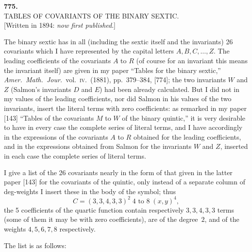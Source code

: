 \documentclass[11pt]{article}
\begin{document}

\begin{center}
\textbf{775.}\\[4pt]
\textsc{TABLES OF COVARIANTS OF THE BINARY SEXTIC.}\\[4pt]
[Written in 1894: \textit{now first published}.]
\end{center}

\bigskip

\noindent
The binary sextic has in all (including the sextic itself and the
invariants) 26 covariants which I have represented by the capital
letters $A,B,C,\ldots,Z$.  The leading coefficients of the covariants
$A$ to $R$ (of course for an invariant this means the invariant
itself) are given in my paper ``Tables for the binary sextic,''
\textit{Amer.\ Math.\ Jour.}\ vol.\ \textsc{iv}.\ (1881), pp.\ 379--384,
[774]; the two invariants $W$ and $Z$ (Salmon's invariants $D$ and
$E$) had been already calculated.  But I did not in my values of the
leading coefficients, nor did Salmon in his values of the two
invariants, insert the literal terms with zero coefficients: as
remarked in my paper [143] ``Tables of the covariants $M$ to $W$ of
the binary quintic,'' it is very desirable to have in every case the
complete series of literal terms, and I have accordingly in the
expressions of the covariants $A$ to $R$ obtained for the leading
coefficients, and in the expressions obtained from Salmon for the
invariants $W$ and $Z$, inserted in each case the complete series of
literal terms.

\medskip
I give a list of the 26 covariants nearly in the form of that given
in the latter paper [143] for the covariants of the quintic, only
instead of a separate column of deg-weights I insert these in the
body of the symbol; thus
\[
  C = (3,3,4,3,3)^{2}\;\text{4 to 8}\;(x,y)^{4},
\]
the 5 coefficients of the quartic function contain respectively
$3,3,4,3,3$ terms (some of them it may be with zero coefficients),
are of the degree~$2$, and of the weights $4,5,6,7,8$ respectively.

\medskip
The list is as follows:
\end{document}
